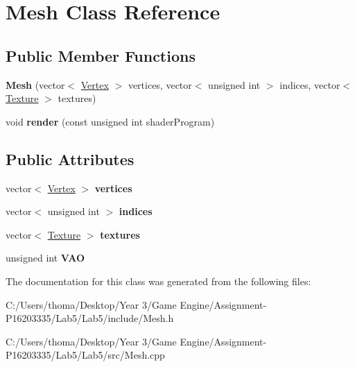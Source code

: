 \hypertarget{class_mesh}{}\section{Mesh Class Reference}
\label{class_mesh}
\subsection*{Public Member Functions}
\begin{DoxyCompactItemize}
\item 
\mbox{\label{class_mesh_a2d6c71adb66e5f270cee7a60c4e23018}} 
{\bfseries Mesh} (vector$<$ \mbox{\hyperlink{struct_vertex}{Vertex}} $>$ vertices, vector$<$ unsigned int $>$ indices, vector$<$ \mbox{\hyperlink{struct_texture}{Texture}} $>$ textures)
\item 
\mbox{\label{class_mesh_a9a6ec018bec776cb7b31fb8433c8a7e7}} 
void {\bfseries render} (const unsigned int shader\+Program)
\end{DoxyCompactItemize}
\subsection*{Public Attributes}
\begin{DoxyCompactItemize}
\item 
\mbox{\label{class_mesh_abe5c05c224e47ba1e8b6393759798a9b}} 
vector$<$ \mbox{\hyperlink{struct_vertex}{Vertex}} $>$ {\bfseries vertices}
\item 
\mbox{\label{class_mesh_a464d9a1d7e7a4f67321dffc1e8b44b7d}} 
vector$<$ unsigned int $>$ {\bfseries indices}
\item 
\mbox{\label{class_mesh_a09bf4e8307bf7717c56501ca6293c6c0}} 
vector$<$ \mbox{\hyperlink{struct_texture}{Texture}} $>$ {\bfseries textures}
\item 
\mbox{\label{class_mesh_a79afa055e485fb65b1a7aa5b8eda2940}} 
unsigned int {\bfseries V\+AO}
\end{DoxyCompactItemize}


The documentation for this class was generated from the following files\+:\begin{DoxyCompactItemize}
\item 
C\+:/\+Users/thoma/\+Desktop/\+Year 3/\+Game Engine/\+Assignment-\/\+P16203335/\+Lab5/\+Lab5/include/Mesh.\+h\item 
C\+:/\+Users/thoma/\+Desktop/\+Year 3/\+Game Engine/\+Assignment-\/\+P16203335/\+Lab5/\+Lab5/src/Mesh.\+cpp\end{DoxyCompactItemize}
